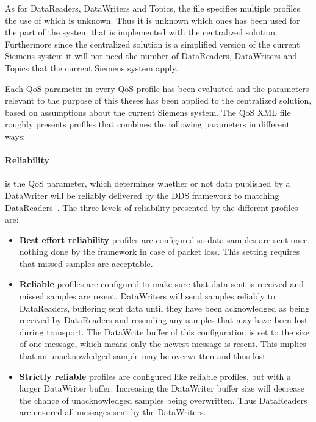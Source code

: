 As for DataReaders, DataWriters and Topics, the file specifies multiple profiles the use of which is unknown. Thus it is unknown which ones has been used for the part of the system that is implemented with the centralized solution. Furthermore since the centralized solution is a simplified version of the current Siemens system it will not need the number of DataReaders, DataWriters and Topics that the current Siemens system apply.

Each QoS parameter in every QoS profile has been evaluated and the parameters relevant to the purpose of this theses has been applied to the centralized solution, based on assumptions about the current Siemens system. The QoS XML file roughly presents profiles that combines the following parameters in different ways:

\paragraph{Reliability} is the QoS parameter, which determines whether or not data published by a DataWriter will be reliably delivered by the DDS framework to matching DataReaders~\cite{rtiConnextUsersManual}. The three levels of reliability presented by the different profiles are:

\begin{itemize}
	\item \textbf{Best effort reliability} profiles are configured so data samples are sent once, nothing done by the framework in case of packet loss. This setting requires that missed samples are acceptable.
	
	\item \textbf{Reliable} profiles are configured to make sure that data sent is received and missed samples are resent. DataWriters will send samples reliably to DataReaders, buffering sent data until they have been acknowledged as being received by DataReaders and resending any samples that may have been lost during transport. The DataWrite buffer of this configuration is set to the size of one message, which means only the newest message is resent. This implies that an unacknowledged sample may be overwritten and thus lost. 
	
	\item \textbf{Strictly reliable} profiles are configured like reliable profiles, but with a larger DataWriter buffer. Increasing the DataWriter buffer size will decrease the chance of unacknowledged samples being overwritten. Thus DataReaders are ensured all messages sent by the DataWriters.
	
\end{itemize}

